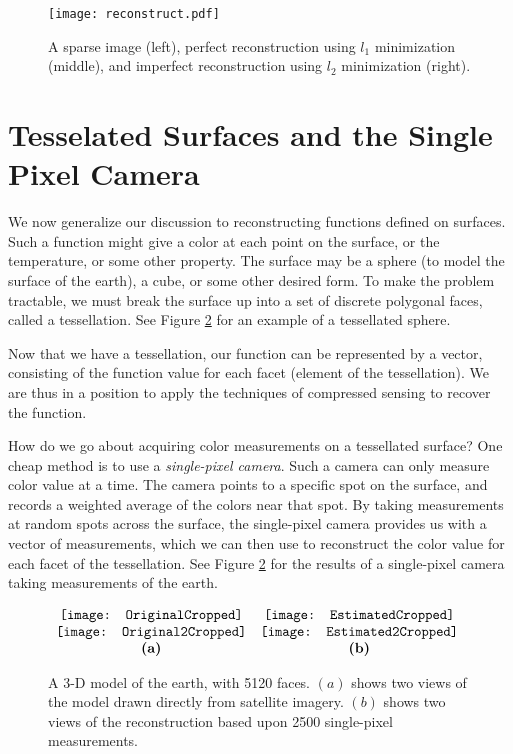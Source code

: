 \begin{figure}
\centering
\texttt{[image: reconstruct.pdf]}
\caption{A sparse image (left), perfect reconstruction using $l_1$ minimization (middle),  and
imperfect reconstruction using $l_2$ minimization (right).}
\label{fig:reconstruct}
\end{figure}
\section*{Tesselated Surfaces and the Single Pixel Camera}
We now generalize our discussion to reconstructing functions defined on surfaces. Such a function might
give a color at each point on the surface, or the temperature, or some other property. The surface may be 
a sphere (to model the surface of the earth), a cube, or some other desired form. To make the problem 
tractable, we must break the surface up into a set of discrete polygonal faces, called a tessellation. See
Figure \ref{Fig:Earth} for an example of a tessellated sphere.

Now that we have a tessellation, our function can be represented by a vector, consisting of the function value 
for each facet (element of the tessellation). We are thus in a position to apply the techniques of compressed
sensing to recover the function. 

How do we go about acquiring color measurements on a tessellated surface? One cheap method is to use a \emph{single-pixel
camera}. Such a camera can only measure color value at a time. The camera points to a specific spot on the surface, and
records a weighted average of the colors near that spot. By taking measurements at random spots across the surface,
the single-pixel camera provides us with a vector of measurements, which we can then use to reconstruct the color value for
each facet of the tessellation. See Figure \ref{Fig:Earth} for the results of a single-pixel camera taking measurements of the earth.

\begin{figure}
\begin{center}
$\begin{array}{cc}
\texttt{[image: OriginalCropped]} &
\texttt{[image: EstimatedCropped]} \\
\texttt{[image: Original2Cropped]} &
\texttt{[image: Estimated2Cropped]} \\
\mbox{\bf (a)} & \mbox{\bf (b)}
\end{array}$
\end{center}
\caption{A 3-D model of the earth, with 5120 faces. $(a)$ shows two views of the model drawn directly from satellite imagery. $(b)$ shows two views of the reconstruction based upon 2500 single-pixel measurements.}
\label{Fig:Earth}
\end{figure}

